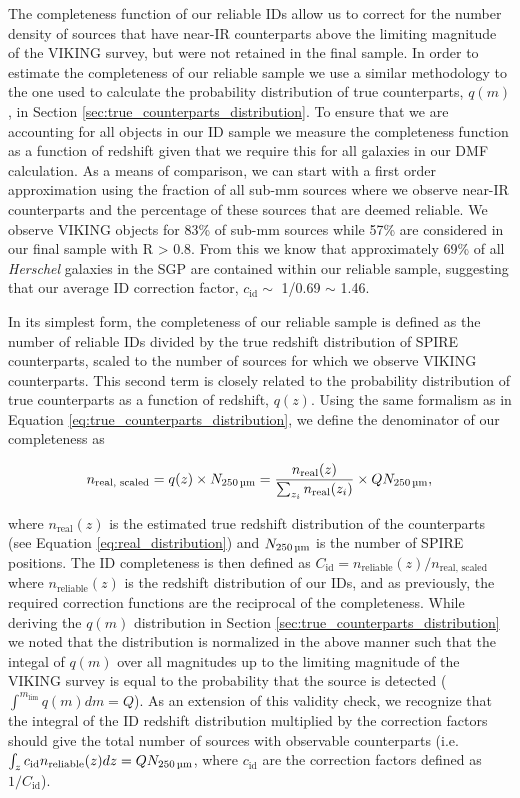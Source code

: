 The completeness function of our reliable IDs allow us to correct for the number density of sources that have near-IR counterparts above the limiting magnitude of the VIKING survey, but were not retained in the final sample. In order to estimate the completeness of our reliable sample we use a similar methodology to the one used to calculate the probability distribution of true counterparts, $q(m)$, in Section \ref{sec:true_counterparts_distribution}. To ensure that we are accounting for all objects in our ID sample we measure the completeness function as a function of redshift given that we require this for all galaxies in our DMF calculation. As a means of comparison, we can start with a first order approximation using the fraction of all sub-mm sources where we observe near-IR counterparts and the percentage of these sources that are deemed reliable. We observe VIKING objects for 83\% of sub-mm sources while 57\% are considered in our final sample with R > 0.8. From this we know that approximately 69\% of all \textit{Herschel} galaxies in the SGP are contained within our reliable sample, suggesting that our average ID correction factor, $c_{\textrm{id}} \sim$ 1/0.69 $\sim$ 1.46.

In its simplest form, the completeness of our reliable sample is defined as the number of reliable IDs divided by the true redshift distribution of SPIRE counterparts, scaled to the number of sources for which we observe VIKING counterparts. This second term is closely related to the probability distribution of true counterparts as a function of redshift, $q(z)$. Using the same formalism as in Equation \ref{eq:true_counterparts_distribution}, we define the denominator of our completeness as

\begin{equation}
    n_{\textrm{real, scaled}} = q(z)\times N_{\textrm{250\,\micron}} = \frac{n_{\textrm{real}}(z)}{\sum_{z_i}n_{\textrm{real}}(z_i)}\times QN_{\textrm{250\,\micron}},
\end{equation}

\noindent where $n_{\textrm{real}}(z)$ is the estimated true redshift distribution of the counterparts (see Equation \ref{eq:real_distribution}) and $N_{\textrm{250\,\micron}}$ is the number of SPIRE positions. The ID completeness is then defined as $C_{\textrm{id}} = n_{\textrm{reliable}}(z)/n_{\textrm{real, scaled}}$ where $n_{\textrm{reliable}}(z)$ is the redshift distribution of our IDs, and as previously, the required correction functions are the reciprocal of the completeness. While deriving the $q(m)$ distribution in Section \ref{sec:true_counterparts_distribution} we noted that the distribution is normalized in the above manner such that the integal of $q(m)$ over all magnitudes up to the limiting magnitude of the VIKING survey is equal to the probability that the source is detected ($\int^{m_\textrm{lim}} q(m) dm = Q$). As an extension of this validity check, we recognize that the integral of the ID redshift distribution multiplied by the correction factors should give the total number of sources with observable counterparts (i.e. $\int_z c_{\textrm{id}} n_{\textrm{reliable}}(z) dz = QN_{\textrm{250\,\micron}}$, where $c_{\textrm{id}}$ are the correction factors defined as $1/C_{\textrm{id}}$).

